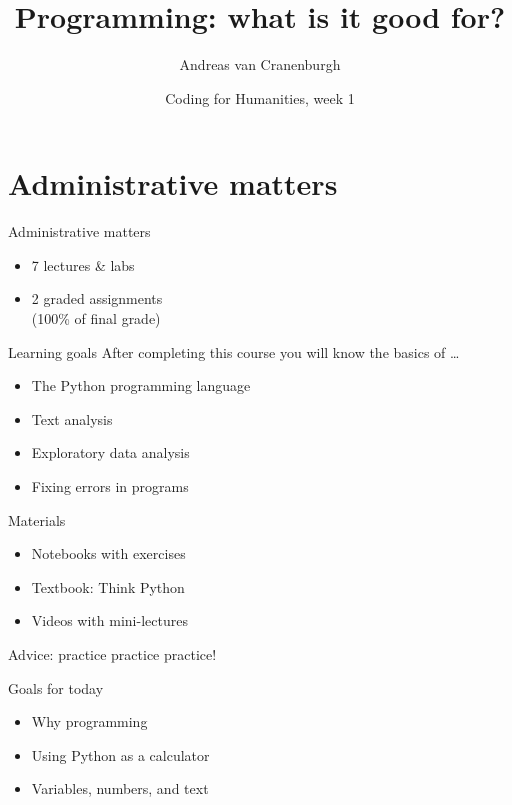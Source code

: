 \documentclass{beamer}
\title{Programming: what is it good for?}
\author{Andreas van Cranenburgh}
\date{Coding for Humanities, week 1}
\begin{document}
\begin{frame}
 \titlepage
\end{frame}

\begin{frame}
 \tableofcontents
\end{frame}

\section{Administrative matters}

\frame{\tableofcontents[currentsection]}

\begin{frame}{Administrative matters}
	\begin{itemize}
		\item 7 lectures \& labs
		\item 2 graded assignments \\
			(100\% of final grade)
	\end{itemize}
\end{frame}

\begin{frame}{Learning goals}
	After completing this course you will know the basics of \dots
	\begin{itemize}
		\item The Python programming language
		\item Text analysis
		\item Exploratory data analysis
		\item Fixing errors in programs
	\end{itemize}
\end{frame}

\begin{frame}{Materials}
	\begin{itemize}
		\item Notebooks with exercises
		\item Textbook: Think Python
		\item Videos with mini-lectures
	\end{itemize}

	Advice: practice practice practice!
\end{frame}


\begin{frame}{Goals for today}
	\begin{itemize}
		\item Why programming
		\item Using Python as a calculator
		\item Variables, numbers, and text
	\end{itemize}
\end{frame}
\end{document}
